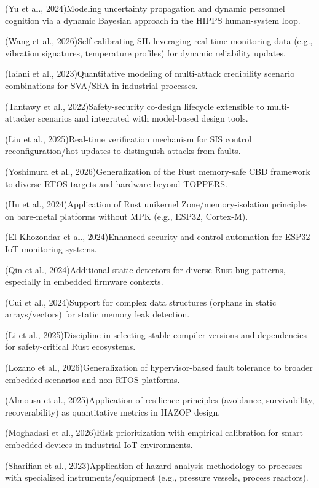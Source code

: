 \documentclass[11pt,a4paper]{article}
\begin{document}
\begin{description}[leftmargin=2.6em,style=nextline]
\item[\textbf{FW1}] (Yu et al., 2024)\hfill Modeling uncertainty propagation and dynamic personnel cognition via a dynamic Bayesian approach in the HIPPS human-system loop.
\item[\textbf{FW2}] (Wang et al., 2026)\hfill Self-calibrating SIL leveraging real-time monitoring data (e.g., vibration signatures, temperature profiles) for dynamic reliability updates.
\item[\textbf{FW3}] (Iaiani et al., 2023)\hfill Quantitative modeling of multi-attack credibility scenario combinations for SVA/SRA in industrial processes.
\item[\textbf{FW4}] (Tantawy et al., 2022)\hfill Safety-security co-design lifecycle extensible to multi-attacker scenarios and integrated with model-based design tools.
\item[\textbf{FW5}] (Liu et al., 2025)\hfill Real-time verification mechanism for SIS control reconfiguration/hot updates to distinguish attacks from faults.
\item[\textbf{FW6}] (Yoshimura et al., 2026)\hfill Generalization of the Rust memory-safe CBD framework to diverse RTOS targets and hardware beyond TOPPERS.
\item[\textbf{FW7}] (Hu et al., 2024)\hfill Application of Rust unikernel Zone/memory-isolation principles on bare-metal platforms without MPK (e.g., ESP32, Cortex-M).
\item[\textbf{FW8}] (El-Khozondar et al., 2024)\hfill Enhanced security and control automation for ESP32 IoT monitoring systems.
\item[\textbf{FW9}] (Qin et al., 2024)\hfill Additional static detectors for diverse Rust bug patterns, especially in embedded firmware contexts.
\item[\textbf{FW10}] (Cui et al., 2024)\hfill Support for complex data structures (orphans in static arrays/vectors) for static memory leak detection.
\item[\textbf{FW11}] (Li et al., 2025)\hfill Discipline in selecting stable compiler versions and dependencies for safety-critical Rust ecosystems.
\item[\textbf{FW12}] (Lozano et al., 2026)\hfill Generalization of hypervisor-based fault tolerance to broader embedded scenarios and non-RTOS platforms.
\item[\textbf{FW13}] (Almousa et al., 2025)\hfill Application of resilience principles (avoidance, survivability, recoverability) as quantitative metrics in HAZOP design.
\item[\textbf{FW14}] (Moghadasi et al., 2026)\hfill Risk prioritization with empirical calibration for smart embedded devices in industrial IoT environments.
\item[\textbf{FW15}] (Sharifian et al., 2023)\hfill Application of hazard analysis methodology to processes with specialized instruments/equipment (e.g., pressure vessels, process reactors).
\end{description}
\end{document}
